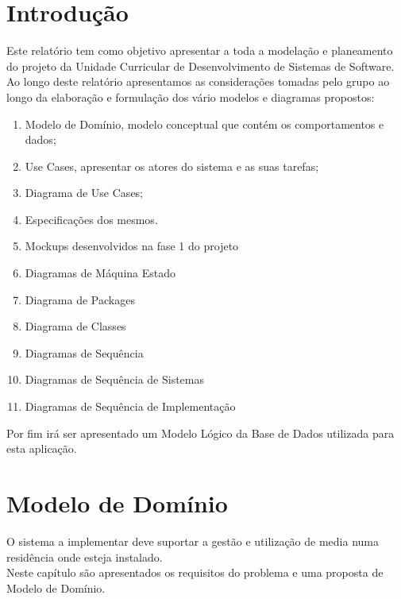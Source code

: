 \documentclass[a4paper]{report}
\begin{document}
\pagebreak

\chapter{Introdução}
Este relatório tem como objetivo apresentar a toda a modelação e planeamento do projeto
da Unidade Curricular de Desenvolvimento de Sistemas de Software.\\
Ao longo deste relatório apresentamos as considerações tomadas pelo grupo
ao longo da elaboração e formulação dos vário modelos e diagramas propostos:
\begin{enumerate}
    \item Modelo de Domínio, modelo conceptual que contém os
        comportamentos e dados;
    \item Use Cases, apresentar os atores do sistema e as suas tarefas;
    \item Diagrama de Use Cases;
    \item Especificações dos mesmos.
    \item Mockups desenvolvidos na fase 1 do projeto
    \item Diagramas de Máquina Estado
    \item Diagrama de Packages
    \item Diagrama de Classes
    \item Diagramas de Sequência
    \item Diagramas de Sequência de Sistemas
    \item Diagramas de Sequência de Implementação
\end{enumerate}
Por fim irá ser apresentado um Modelo Lógico da Base de Dados utilizada para
esta aplicação.

\chapter{Modelo de Domínio}
O sistema a implementar deve suportar a gestão e utilização de media
numa residência onde esteja instalado.\\
Neste capítulo são apresentados os requisitos do problema e uma proposta de 
Modelo de Domínio.
\end{document}
